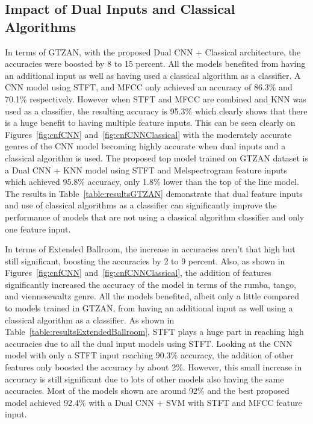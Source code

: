 \documentclass[10pt,twocolumn,letterpaper]{article}
\begin{document}
	\subsection{Impact of Dual Inputs and Classical Algorithms} %
	\label{section:impactDual}
	
	In terms of GTZAN, with the proposed Dual CNN + Classical architecture, the accuracies were boosted by 8 to 15 percent. All the models benefited from having an additional input as well as having used a classical algorithm as a classifier. A CNN model using STFT, and MFCC only achieved an accuracy of 86.3\% and 70.1\% respectively. However when STFT and MFCC are combined and KNN was used as a classifier, the resulting accuracy is 95.3\% which clearly shows that there is a huge benefit to having multiple feature inputs. This can be seen clearly on Figures~\ref{fig:cnfCNN} and~\ref{fig:cnfCNNClassical} with the moderately accurate genres of the CNN model becoming highly accurate when dual inputs and a classical algorithm is used. The proposed top model trained on GTZAN dataset is a Dual CNN + KNN model using STFT and Melspectrogram feature inputs which achieved 95.8\% accuracy, only 1.8\% lower than the top of the line model. The results in Table~\ref{table:resultsGTZAN} demonstrate that dual feature inputs and use of classical algorithms as a classifier can significantly improve the performance of models that are not using a classical algorithm classifier and only one feature input.
	
	In terms of Extended Ballroom, the increase in accuracies aren't that high but still significant, boosting the accuracies by 2 to 9 percent. Also, as shown in Figures~\ref{fig:cnfCNN} and~\ref{fig:cnfCNNClassical}, the addition of features significantly increased the accuracy of the model in terms of the rumba, tango, and viennesewaltz genre. All the models benefited, albeit only a little compared to models trained in GTZAN, from having an additional input as well using a classical algorithm as a classifier. As shown in Table~\ref{table:resultsExtendedBallroom}, STFT plays a huge part in reaching high accuracies due to all the dual input models using STFT. Looking at the CNN model with only a STFT input reaching 90.3\% accuracy, the addition of other features only boosted the accuracy by about 2\%. However, this small increase in accuracy is still significant due to lots of other models also having the same accuracies. Most of the models shown are around 92\% and the best proposed model achieved 92.4\% with a Dual CNN + SVM with STFT and MFCC feature input.
\end{document}
